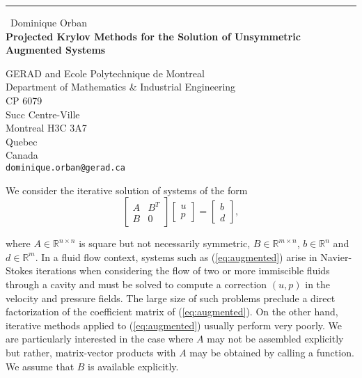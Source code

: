 \documentclass{report}
\begin{document}
\begin{center}
\rule{6in}{1pt} \
{\large Dominique Orban \\
{\bf Projected Krylov Methods for the Solution of Unsymmetric Augmented Systems}}

GERAD and Ecole Polytechnique de Montreal \\ Department of Mathematics & Industrial Engineering \\ CP 6079 \\ Succ Centre-Ville \\ Montreal H3C 3A7 \\ Quebec \\ Canada
\\
{\tt dominique.orban@gerad.ca}\end{center}

\newcommand{\eqn}[2]{%
\begin{equation}
\label{#1}
{#2}
\end{equation}
}
\newcommand{\req}[1]{(\ref{#1})}
\newcommand{\sub}[1]{_{{\mbox {\tiny #1}}}}
\newcommand{\half}{{\textstyle \frac{1}{2}}}
\newcommand{\T}{^T\!}
\newcommand{\R}{{\mathbb R}}
\newcommand{\minim}{\mathop{\hbox{minimize}}}
\newcommand{\minimize}[1]{\displaystyle\minim_{#1}}
\newcommand{\st}{\mathop{\hbox{subject to}}}
\newcommand{\vect}[1]{
\left[
\begin{array}{c}
#1
\end{array}
\right]
}

We consider the iterative solution of systems of the form
\eqn{eq:augmented}{
\begin{bmatrix}
A & B^T \\
B & 0
\end{bmatrix}
\vect{u \\ p} = \vect{b \\ d},
}
where $A \in \R^{n \times n}$ is square but not necessarily symmetric, $B \in
\R^{m \times n}$, $b \in \R^n$ and $d \in \R^m$. In a fluid flow context,
systems such as \req{eq:augmented} arise in Navier-Stokes
iterations when considering the flow of two or more immiscible fluids through a
cavity and must be solved to compute a correction $(u,p)$ in the velocity and
pressure fields. The large size of such problems preclude a direct
factorization of the coefficient matrix of \req{eq:augmented}. On the other
hand, iterative methods applied to \req{eq:augmented} usually perform very
poorly. We are particularly interested in the case where $A$ may not be
assembled explicitly but rather, matrix-vector products with $A$ may be
obtained by calling a function. We assume that $B$ is available explicitly.
\end{document}
